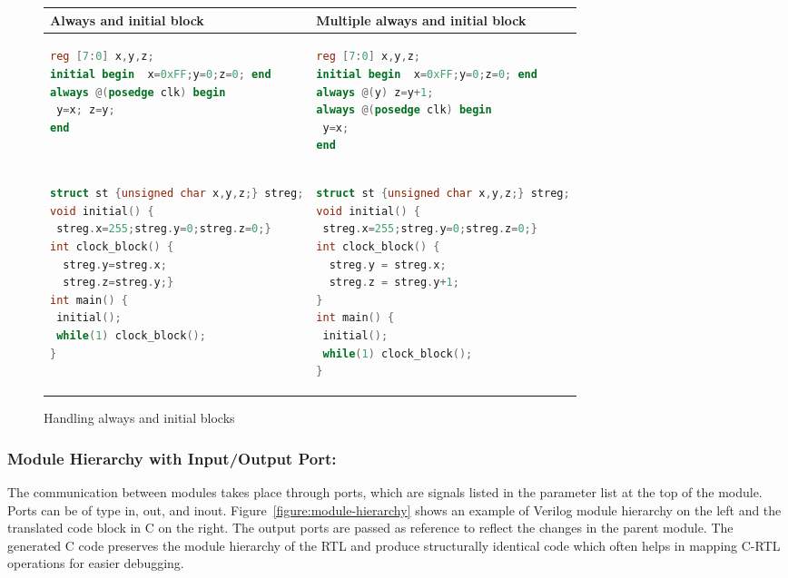 \begin{figure*}[htbp]
\scriptsize
\begin{tabular}{l|l}
\hline
Always and initial block & Multiple always and initial block\\
\hline
\begin{lstlisting}[mathescape=true,language=Verilog]
reg [7:0] x,y,z;
initial begin  x=0xFF;y=0;z=0; end
always @(posedge clk) begin
 y=x; z=y;
end
\end{lstlisting}
& 
\begin{lstlisting}[mathescape=true,language=Verilog]
reg [7:0] x,y,z;
initial begin  x=0xFF;y=0;z=0; end
always @(y) z=y+1;
always @(posedge clk) begin
 y=x;
end
\end{lstlisting}
\\
\hline 
\begin{lstlisting}[mathescape=true,language=C]
struct st {unsigned char x,y,z;} streg;
void initial() {
 streg.x=255;streg.y=0;streg.z=0;}
int clock_block() {
  streg.y=streg.x; 
  streg.z=streg.y;}
int main() {
 initial();
 while(1) clock_block();
}
\end{lstlisting}
&
\begin{lstlisting}[mathescape=true,language=C]
struct st {unsigned char x,y,z;} streg;
void initial() { 
 streg.x=255;streg.y=0;streg.z=0;}
int clock_block() {
  streg.y = streg.x; 
  streg.z = streg.y+1;
}
int main() {
 initial();
 while(1) clock_block();
} 
\end{lstlisting}
\\
\hline
\end{tabular}
\caption{Handling always and initial blocks}
\label{figure:always-init}
\end{figure*}

\subsubsection{Module Hierarchy with Input/Output Port:}
The communication between modules takes place through 
ports, which are signals listed in the parameter list at the 
top of the module. Ports can be of type in, out, and inout. 
Figure~\ref{figure:module-hierarchy} shows an example of 
Verilog module hierarchy on the left and the translated 
code block in C on the right. The output ports are passed 
as reference to reflect the changes in the parent module.
The generated C code preserves the module hierarchy of 
the RTL and produce structurally identical code which 
often helps in mapping C-RTL operations for easier debugging. 

